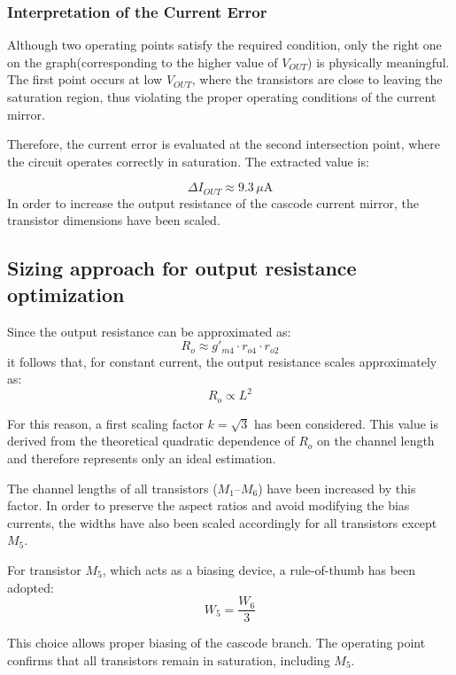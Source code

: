 \subsubsection{Interpretation of the Current Error}
Although two operating points satisfy the required condition, only the right one on the graph(corresponding to the higher value of $V_{OUT}$) is physically meaningful. The first point occurs at low $V_{OUT}$, where the transistors are close to leaving the saturation region, thus violating the proper operating conditions of the current mirror.

Therefore, the current error is evaluated at the second intersection point, where the circuit operates correctly in saturation. The extracted value is:

\begin{equation*}
\Delta I_{OUT} \approx 9.3\,\mu\text{A}
\end{equation*}
In order to increase the output resistance of the cascode current mirror, the transistor dimensions have been scaled.
\subsection{Sizing approach for output resistance optimization}
Since the output resistance can be approximated as:
\begin{equation*}
R_o \approx g'_{m4} \cdot r_{o4} \cdot r_{o2}
\end{equation*}
it follows that, for constant current, the output resistance scales approximately as:
\begin{equation*}
R_o \propto L^2
\end{equation*}

For this reason, a first scaling factor $k = \sqrt{3}$ has been considered. This value is derived from the theoretical quadratic dependence of $R_o$ on the channel length and therefore represents only an ideal estimation.

The channel lengths of all transistors ($M_1$--$M_6$) have been increased by this factor. In order to preserve the aspect ratios and avoid modifying the bias currents, the widths have also been scaled accordingly for all transistors except $M_5$.

For transistor $M_5$, which acts as a biasing device, a rule-of-thumb has been adopted:
\begin{equation*}
W_5 = \frac{W_6}{3}
\end{equation*}

This choice allows proper biasing of the cascode branch. The operating point confirms that all transistors remain in saturation, including $M_5$.

